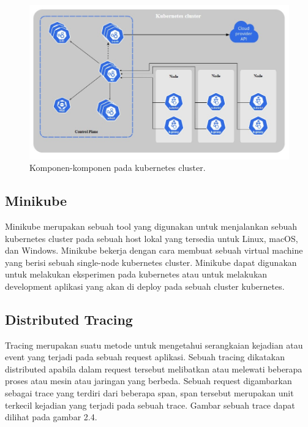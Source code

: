   \begin{figure}[H]
    \centering
      \includegraphics[scale=0.7]{gambar/kubernetes-component}
      \caption{Komponen-komponen pada kubernetes cluster.}
      \label{kubernetes-component}
  \end{figure}

  \subsection{Minikube}
  Minikube merupakan sebuah tool yang digunakan untuk menjalankan sebuah kubernetes cluster pada sebuah host lokal yang tersedia untuk Linux, macOS, dan Windows. Minikube bekerja dengan cara membuat sebuah virtual machine yang berisi sebuah single-node kubernetes cluster. Minikube dapat digunakan untuk melakukan eksperimen pada kubernetes atau untuk melakukan development aplikasi yang akan di deploy pada sebuah cluster kubernetes\cite{Minikube}.

  \subsection{Distributed Tracing}
  Tracing merupakan suatu metode untuk mengetahui serangkaian kejadian atau event yang terjadi pada sebuah request aplikasi. Sebuah tracing dikatakan distributed apabila dalam request tersebut melibatkan atau melewati beberapa proses atau mesin atau jaringan yang berbeda. Sebuah request digambarkan sebagai trace yang terdiri dari beberapa span, span tersebut merupakan unit terkecil kejadian yang terjadi pada sebuah trace. Gambar sebuah trace dapat dilihat pada gambar 2.4.
  
